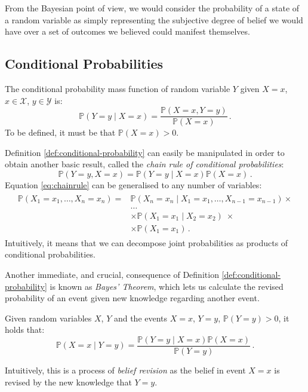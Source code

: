 From the Bayesian point of view, we would consider the probability of a state of a random variable as simply representing the subjective degree of belief we would have over a set of outcomes we believed could manifest themselves.

\subsection{Conditional Probabilities} \label{subsec:conditional-probabilities}
\begin{definition} \label{def:conditional-probability}
	The conditional probability mass function of random variable $Y$ given $X=x$, $x \in \mathcal{X}$, $y \in \mathcal{Y}$ is:
\begin{equation*}
\mathbb{P}(Y=y \mid X=x) = \frac{\mathbb{P}(X=x,Y=y)}{\mathbb{P}(X=x)} \,.
\end{equation*}
To be defined, it must be that $\mathbb{P}(X=x) > 0$.
\end{definition}

Definition \ref{def:conditional-probability} can easily be manipulated in order to obtain another basic result, called the \textit{chain rule of conditional probabilities}:
\begin{equation} \label{eq:chainrule}
	\mathbb{P}(Y=y,X=x) = \mathbb{P}(Y=y \mid X=x) \mathbb{P}(X=x) \,.
\end{equation}
Equation \ref{eq:chainrule} can be generalised to any number of variables:
\begin{align} \label{eq:chainrule-multiple}
\begin{split}
	\mathbb{P}(X_1=x_1, \ldots , X_n=x_n ) = & \mathbb{P}(X_n=x_n \mid X_1=x_1, \ldots, X_{n-1}=x_{n-1}) \times \\
	&  \ldots   \\
	 &\times \mathbb{P}(X_1=x_1 \mid X_2=x_2 ) \; \times \\
	 &\times \mathbb{P}(X_1=x_1) \,.
\end{split}
\end{align}
Intuitively, it means that we can decompose joint probabilities as products of conditional probabilities.  

Another immediate, and crucial, consequence of Definition \ref{def:conditional-probability} is known as \textit{Bayes' Theorem}, which lets us calculate the revised probability of an event given new knowledge regarding another event.
\begin{theorem} \label{th:bayes-theorem}
	Given random variables $X$, $Y$ and the events $X=x$, $Y=y$, $\mathbb{P}(Y=y) > 0$, it holds that:
	\begin{equation*}
		\mathbb{P}(X=x \mid Y=y)=\frac{\mathbb{P}(Y=y \mid X=x) \mathbb{P}(X=x)}{\mathbb{P}(Y=y)} \,.
	\end{equation*}
\end{theorem}
Intuitively, this is a process of \textit{belief revision} as the belief in event $X=x$ is revised by the new knowledge that $Y=y$. 

